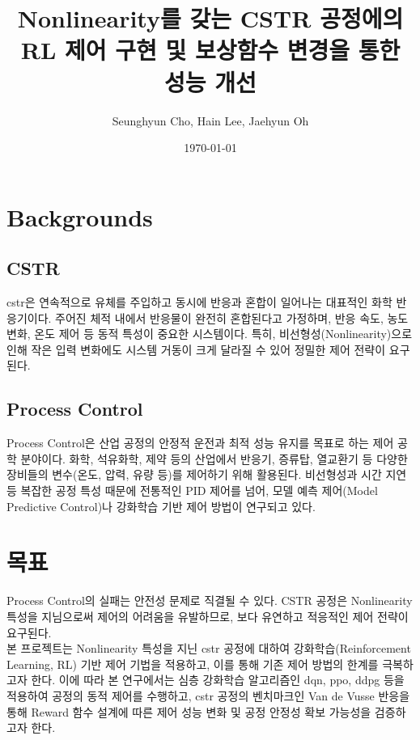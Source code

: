 \documentclass[11pt]{article}
\begin{document}
\title{Nonlinearity를 갖는 CSTR 공정에의 RL 제어 구현 및 보상함수 변경을 통한 성능 개선}
\author{Seunghyun Cho, Hain Lee, Jaehyun Oh}
\date{\today}


\setlength{\droptitle}{-4cm}  %
\maketitle

 
\section{Backgrounds}
\subsection{CSTR}
\gls{cstr}은 연속적으로 유체를 주입하고 동시에 반응과 혼합이 일어나는 대표적인 화학 반응기이다. 
주어진 체적 내에서 반응물이 완전히 혼합된다고 가정하며, 반응 속도, 농도 변화, 온도 제어 등 동적 특성이 중요한 시스템이다. 
특히, 비선형성(Nonlinearity)으로 인해 작은 입력 변화에도 시스템 거동이 크게 달라질 수 있어 정밀한 제어 전략이 요구된다.


\subsection{Process Control}
Process Control은 산업 공정의 안정적 운전과 최적 성능 유지를 목표로 하는 제어 공학 분야이다. 
화학, 석유화학, 제약 등의 산업에서 반응기, 증류탑, 열교환기 등 다양한 장비들의 변수(온도, 압력, 유량 등)를 제어하기 위해 활용된다. 
비선형성과 시간 지연 등 복잡한 공정 특성 때문에 전통적인 PID 제어를 넘어, 모델 예측 제어(Model Predictive Control)나 강화학습 기반 제어 방법이 연구되고 있다.



\section{목표}
Process Control의 실패는 안전성 문제로 직결될 수 있다.
CSTR 공정은 Nonlinearity 특성을 지님으로써 제어의 어려움을 유발하므로, 보다 유연하고 적응적인 제어 전략이 요구된다.\\
본 프로젝트는 Nonlinearity 특성을 지닌 \gls{cstr} 공정에 대하여 강화학습(Reinforcement Learning, RL) 기반 제어 기법을 적용하고, 이를 통해 기존 제어 방법의 한계를 극복하고자 한다.
이에 따라 본 연구에서는 심층 강화학습 알고리즘인 \gls{dqn}, \gls{ppo}, \gls{ddpg} 등을 적용하여 공정의 동적 제어를 수행하고,
\gls{cstr} 공정의 벤치마크인 Van de Vusse 반응을 통해 Reward 함수 설계에 따른 제어 성능 변화 및 공정 안정성 확보 가능성을 검증하고자 한다.
\end{document}
